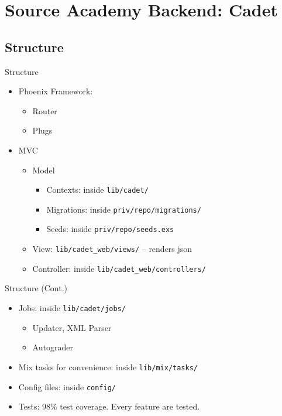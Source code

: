 \documentclass[12pt]{beamer}
\begin{document}
\section{Source Academy Backend: Cadet}
\subsection{Structure}
\begin{frame}{Structure}
  \begin{itemize}
    \item Phoenix Framework:
          \begin{itemize}
            \item Router
            \item Plugs
          \end{itemize}
    \item MVC
          \begin{itemize}
            \item Model
                  \begin{itemize}
                    \item Contexts: inside \texttt{lib/cadet/}
                    \item Migrations: inside \texttt{priv/repo/migrations/}
                    \item Seeds: inside \texttt{priv/repo/seeds.exs}
                  \end{itemize}
            \item View: \texttt{lib/cadet\_web/views/} -- renders json
            \item Controller: inside \texttt{lib/cadet\_web/controllers/}
          \end{itemize}
  \end{itemize}
\end{frame}

\begin{frame}{Structure (Cont.)}
  \begin{itemize}
    \item Jobs: inside \texttt{lib/cadet/jobs/}
          \begin{itemize}
            \item Updater, XML Parser
            \item Autograder
          \end{itemize}
    \item Mix tasks for convenience: inside \texttt{lib/mix/tasks/}
    \item Config files: inside \texttt{config/}
    \item Tests: 98\% test coverage. Every feature are tested.
  \end{itemize}
\end{frame}
\end{document}
